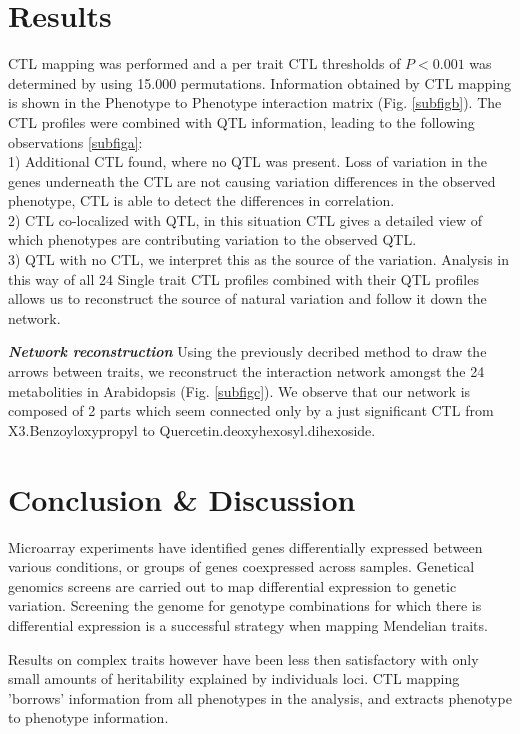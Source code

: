 \documentclass{bioinfo}
\begin{document}
\section{Results}
  CTL mapping was performed and a per trait CTL thresholds of $P < 0.001$ was determined by using 15.000 permutations.
  Information obtained by CTL mapping is shown in the Phenotype to Phenotype interaction matrix (Fig. \ref{subfigb}).
  The CTL profiles were combined with QTL information, leading to the following observations \ref{subfiga}:\\
  1) Additional CTL found, where no QTL was present. Loss of variation in the genes 
  underneath the CTL are not causing variation differences in the observed phenotype, CTL is able to 
  detect the differences in correlation.\\
  2) CTL co-localized with QTL, in this situation CTL gives a detailed view of which phenotypes 
  are contributing variation to the observed QTL.\\
  3) QTL with no CTL, we interpret this as the source of the variation. Analysis in this way of 
  all 24 Single trait CTL profiles combined with their QTL profiles allows us to reconstruct the 
  source of natural variation and follow it down the network.

\emph{ {\bf Network reconstruction}}
  Using the previously decribed method to draw the arrows between traits, we reconstruct the interaction 
  network amongst the 24 metabolities in Arabidopsis (Fig. \ref{subfigc}). We observe that our network is 
  composed of 2 parts which seem connected only by a just significant CTL from X3.Benzoyloxypropyl to 
  Quercetin.deoxyhexosyl.dihexoside.

\section{Conclusion \& Discussion}
  Microarray experiments have identified genes differentially expressed between various 
  conditions, or groups of genes coexpressed across samples. Genetical genomics screens 
  are carried out to map differential expression to genetic variation. Screening 
  the genome for genotype combinations for which there is differential expression is 
  a successful strategy when mapping Mendelian traits. 
  
  Results on complex traits however have been less then satisfactory with only small 
  amounts of heritability explained by individuals loci. CTL mapping 'borrows'
  information from all phenotypes in the analysis, and extracts phenotype to phenotype 
   information.
 
\end{document}
